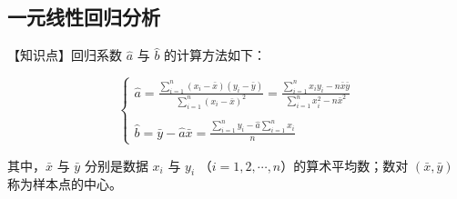 \clearpage
\subsection*{一元线性回归分析}

【知识点】回归系数 $\hat{a}$ 与 $\hat{b}$ 的计算方法如下：

$$
\begin{cases}
\hat{a} = \frac{\sum\limits_{i=1}^{n}(x_i - \bar{x})(y_i - \bar{y})}{\sum\limits_{i=1}^{n}(x_i - \bar{x})^2} = \frac{\sum\limits_{i=1}^{n}x_i y_i - n\bar{x}\bar{y}}{\sum\limits_{i=1}^{n}x_i^2 - n\bar{x}^2} \\
\\
\hat{b} = \bar{y} - \hat{a}\bar{x} = \frac{\sum\limits_{i=1}^{n}y_i - \hat{a}\sum\limits_{i=1}^{n}x_i}{n}
\end{cases}
$$

其中，$\bar{x}$ 与 $\bar{y}$ 分别是数据 $x_i$ 与 $y_i$ （$i = 1, 2, \cdots, n$）的算术平均数；数对 $(\bar{x}, \bar{y})$
称为样本点的中心。

